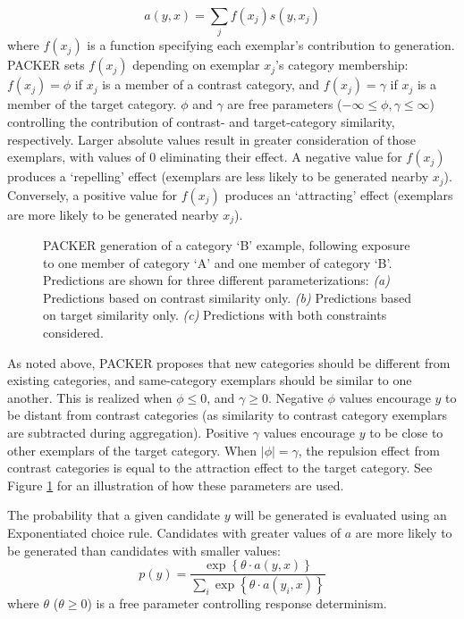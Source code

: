 \documentclass[12pt]{article}
\newcommand\inputpgf[2]{{
\let\pgfimageWithoutPath\pgfimage
\renewcommand{\pgfimage}[2][]{\pgfimageWithoutPath[##1]{#1/##2}}

}}
\begin{document}
\begin{flushleft}
\begin{equation}
    a(y, x) = \sum_j{f(x_j) s(y, x_j)}
\end{equation}
% 
where $f(x_j)$ is a function specifying each exemplar's contribution to generation. PACKER sets $f(x_j)$ depending on exemplar $x_j$'s category membership: $f(x_j) = \phi$ if $x_j$ is a member of a contrast category, and $f(x_j) = \gamma$ if $x_j$ is a member of the target category. $\phi$ and $\gamma$ are free parameters ($-\infty \leq \phi, \gamma \leq \infty$) controlling the contribution of contrast- and target-category similarity, respectively. Larger absolute values result in greater consideration of those exemplars, with values of 0 eliminating their effect. A negative value for $f(x_j)$ produces a `repelling' effect (exemplars are less likely to be generated nearby $x_j$). Conversely, a positive value for $f(x_j)$ produces an `attracting' effect (exemplars are more likely to be generated nearby $x_j$). 

\begin{figure}
    \begin{center}
    \inputpgf{figs/}{packer-examples.pgf}
    \caption{PACKER generation of a category `B' example, following exposure to one member of category `A' and one member of category `B'. Predictions are shown for three different parameterizations: \textit{(a)} Predictions based on contrast similarity only. \textit{(b)} Predictions based on target similarity only.  \textit{(c)} Predictions with both constraints considered.}
    \label{fig:packer-examples}
    \end{center}
\end{figure}

As noted above, PACKER proposes that new categories should be different from existing categories, and same-category exemplars should be similar to one another. This is realized when $\phi \leq 0$, and $\gamma \geq 0$. Negative $\phi$ values encourage $y$ to be distant from contrast categories (as similarity to contrast category exemplars are subtracted during aggregation). Positive $\gamma$ values encourage $y$ to be close to other exemplars of the target category. When $|\phi| = \gamma$, the repulsion effect from contrast categories is equal to the attraction effect to the target category. See Figure \ref{fig:packer-examples} for an illustration of how these parameters are used.

The probability that a given candidate $y$ will be generated is evaluated using an Exponentiated \citet{luce1977choice} choice rule. Candidates with greater values of $a$ are more likely to be generated than candidates with smaller values:
% 
\begin{equation}
p(y) = \dfrac
    { \exp  \left \{ \theta \cdot a \left( y, x \right) \right \} } 
    { \sum_i{ \exp  \left \{ \theta \cdot a \left( y_i, x \right) \right\}  } }
    \label{eq:packer-choice}
\end{equation}
% 
where $\theta$ ($\theta \geq 0$) is a free parameter controlling response determinism. 


\end{flushleft}
\end{document}
